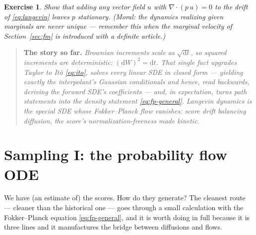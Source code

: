 \documentclass[10pt,a4paper]{article}
\newtheorem{exercise}{Exercise}
\newenvironment{recap}
{\par\medskip\noindent\begin{quote}\small\textbf{The story so far.}\itshape\;}
{\end{quote}\medskip}
\newcommand{\dd}{\mathrm{d}}
\begin{document}
\begin{exercise}
\label{ex:divfree}
Show that adding any vector field $u$ with
$\nabla\!\cdot\!(p\, u) = 0$ to the drift of \eqref{eq:langevin} leaves
$p$ stationary. (Moral: the dynamics realizing given marginals are never
unique --- remember this when the marginal velocity of
Section~\ref{sec:fm} is introduced with a definite article.)
\end{exercise}

\begin{recap}
Brownian increments scale as $\sqrt{\dd t}$, so squared increments are
deterministic: $(\dd W)^2 = \dd t$. That single fact upgrades Taylor to
It\^o \eqref{eq:ito}, solves every linear SDE in closed form ---
yielding exactly the interpolant's Gaussian conditionals and hence,
read backwards, deriving the forward SDE's coefficients --- and, in
expectation, turns path statements into the density statement
\eqref{eq:fp-general}. Langevin dynamics is the special SDE whose
Fokker--Planck flow vanishes: score drift balancing diffusion, the
score's normalization-freeness made kinetic.
\end{recap}

\section{Sampling I: the probability flow ODE}
\label{sec:pfode}

We have (an estimate of) the scores. How do they generate? The cleanest
route --- cleaner than the historical one --- goes through a small
calculation with the Fokker--Planck equation \eqref{eq:fp-general}, and
it is worth doing in full because it is three lines and it manufactures
the bridge between diffusions and flows.
\end{document}
